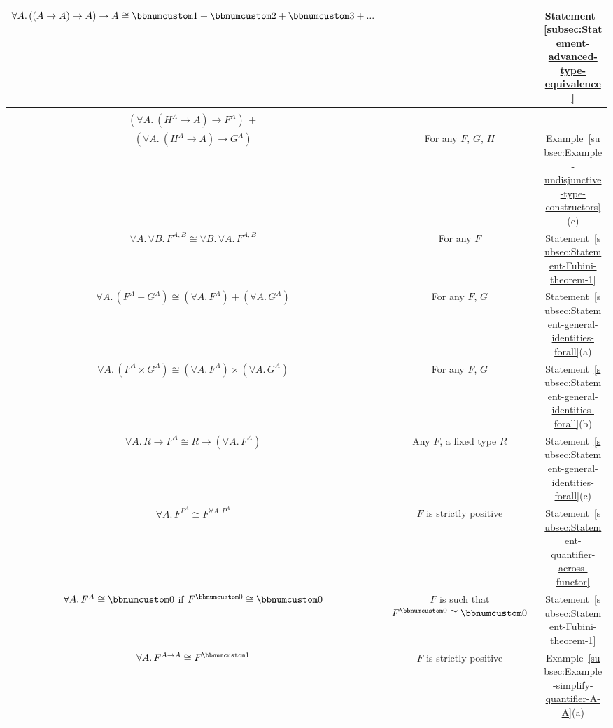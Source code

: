 \begin{table}
\begin{centering}
\begin{tabular}{|c|c|c|}
\hline 
{\footnotesize{}$\forall A.\,((A\rightarrow A)\rightarrow A)\rightarrow A\cong\bbnum 1+\bbnum 2+\bbnum 3+...$} & {\footnotesize{}~} & {\footnotesize{}Statement~\ref{subsec:Statement-advanced-type-equivalence}}\tabularnewline
\hline 
{\footnotesize{}}%
\begin{minipage}[c][17mm][t]{0.1mm}%
%
\end{minipage}{\footnotesize{}}%
\begin{minipage}[c]{0.43\columnwidth}%
\begin{center}
{\footnotesize{}$\forall A.\,(H^{A}\rightarrow A)\rightarrow F^{A}+G^{A}\cong$}\\
{\footnotesize{}$(\forall A.\:(H^{A}\rightarrow A)\rightarrow F^{A})\,+$}\\
{\footnotesize{}$(\forall A.\:(H^{A}\rightarrow A)\rightarrow G^{A})$}
\par\end{center}%
\end{minipage} & {\footnotesize{}For any $F$, $G$, $H$} & {\footnotesize{}Example~\ref{subsec:Example-undisjunctive-type-constructors}(c)}\tabularnewline
\hline 
{\footnotesize{}$\forall A.\,\forall B.\,F^{A,B}\cong\forall B.\,\forall A.\,F^{A,B}$} & {\footnotesize{}For any $F$} & {\footnotesize{}Statement~\ref{subsec:Statement-Fubini-theorem-1}}\tabularnewline
\hline 
{\footnotesize{}$\forall A.\,(F^{A}+G^{A})\cong(\forall A.\,F^{A})+(\forall A.\,G^{A})$} & {\footnotesize{}For any $F$, $G$} & {\footnotesize{}Statement~\ref{subsec:Statement-general-identities-forall}(a)}\tabularnewline
\hline 
{\footnotesize{}$\forall A.\,(F^{A}\times G^{A})\cong(\forall A.\,F^{A})\times(\forall A.\,G^{A})$} & {\footnotesize{}For any $F$, $G$} & {\footnotesize{}Statement~\ref{subsec:Statement-general-identities-forall}(b)}\tabularnewline
\hline 
{\footnotesize{}$\forall A.\,R\rightarrow F^{A}\cong R\rightarrow(\forall A.\,F^{A})$} & {\footnotesize{}Any $F$, a fixed type $R$} & {\footnotesize{}Statement~\ref{subsec:Statement-general-identities-forall}(c)}\tabularnewline
\hline 
{\footnotesize{}$\forall A.\,F^{P^{A}}\cong F^{\forall A.\,P^{A}}$} & {\footnotesize{}$F$ is strictly positive} & {\footnotesize{}Statement~\ref{subsec:Statement-quantifier-across-functor}}\tabularnewline
\hline 
{\footnotesize{}$\forall A.\,F^{A}\cong\bbnum 0$ if $F^{\bbnum 0}\cong\bbnum 0$} & {\footnotesize{}$F$ is such that $F^{\bbnum 0}\cong\bbnum 0$} & {\footnotesize{}Statement~\ref{subsec:Statement-Fubini-theorem-1}}\tabularnewline
\hline 
{\footnotesize{}$\forall A.\,F^{A\rightarrow A}\cong F^{\bbnum 1}$} & {\footnotesize{}$F$ is strictly positive} & {\footnotesize{}Example~\ref{subsec:Example-simplify-quantifier-A-A}(a)}\tabularnewline

\end{tabular}
\end{centering}
\end{table}
